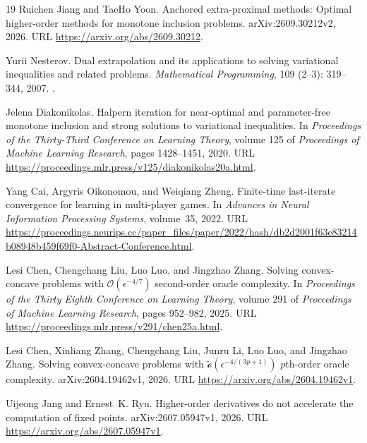 \documentclass[11pt]{article}
\numberwithin{equation}{section}
\theoremstyle{definition}
\theoremstyle{remark}
\begin{document}
\begin{thebibliography}{19}
Ruichen Jiang and TaeHo Yoon.
\newblock Anchored extra-proximal methods: Optimal higher-order methods for
  monotone inclusion problems.
\newblock arXiv:2609.30212v2, 2026.
\newblock URL \url{https://arxiv.org/abs/2609.30212}.

Yurii Nesterov.
\newblock Dual extrapolation and its applications to solving variational
  inequalities and related problems.
\newblock \emph{Mathematical Programming}, 109 (2--3):
  319--344, 2007.
\newblock {}.

Jelena Diakonikolas.
\newblock Halpern iteration for near-optimal and parameter-free monotone
  inclusion and strong solutions to variational inequalities.
\newblock In \emph{Proceedings of the Thirty-Third Conference on Learning
  Theory}, volume 125 of \emph{Proceedings of Machine Learning Research}, pages
  1428--1451, 2020.
\newblock URL \url{https://proceedings.mlr.press/v125/diakonikolas20a.html}.

Yang Cai, Argyris Oikonomou, and Weiqiang Zheng.
\newblock Finite-time last-iterate convergence for learning in multi-player
  games.
\newblock In \emph{Advances in Neural Information Processing Systems},
  volume~35, 2022.
\newblock URL
  \url{https://proceedings.neurips.cc/paper_files/paper/2022/hash/db2d2001f63e83214b08948b459f69f0-Abstract-Conference.html}.

Lesi Chen, Chengchang Liu, Luo Luo, and Jingzhao Zhang.
\newblock Solving convex-concave problems with {$\mathcal{O}(\epsilon^{-4/7})$}
  second-order oracle complexity.
\newblock In \emph{Proceedings of the Thirty Eighth Conference on Learning
  Theory}, volume 291 of \emph{Proceedings of Machine Learning Research}, pages
  952--982, 2025.
\newblock URL \url{https://proceedings.mlr.press/v291/chen25a.html}.

Lesi Chen, Xinliang Zhang, Chengchang Liu, Junru Li, Luo Luo, and Jingzhao
  Zhang.
\newblock Solving convex-concave problems with $\widetilde{\mathcal
  o}(\epsilon^{-4/(3p+1)})$ $p$th-order oracle complexity.
\newblock arXiv:2604.19462v1, 2026{}.
\newblock URL \url{https://arxiv.org/abs/2604.19462v1}.

Uijeong Jang and Ernest~K. Ryu.
\newblock Higher-order derivatives do not accelerate the computation of fixed
  points.
\newblock arXiv:2607.05947v1, 2026.
\newblock URL \url{https://arxiv.org/abs/2607.05947v1}.

\end{thebibliography}

\endgroup
\end{document}
